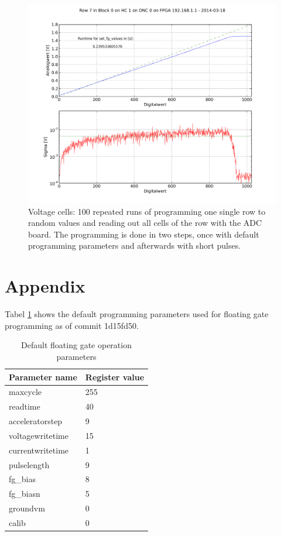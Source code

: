 \documentclass[a4paper,twocolumn,draft=true]{scrartcl}
\begin{document}
\begin{figure}
\includegraphics[scale=.28]{figures/single_row_random_progonerow_afterburn_current.png}
\caption{Voltage cells: 100 repeated runs of programming one single row to random values and reading out all cells of the row with the ADC board. The programming is done in two steps, once with default programming parameters and afterwards with short pulses.}
\label{fig:row_progrow_default_current}
\end{figure}

\section{Appendix}
Tabel \ref{tab:default_fg_values} shows the default programming parameters used for floating gate programming as of commit 1d15fd50.
\begin{table}
\begin{tabular}{l|l}
Parameter name & Register value\\
\hline
maxcycle & 255\\
readtime & 40\\
acceleratorstep & 9\\
voltagewritetime & 15\\
currentwritetime & 1\\
pulselength & 9\\
fg\_bias & 8\\
fg\_biasn & 5\\
groundvm & 0\\
calib & 0\\
\end{tabular}
\caption{Default floating gate operation parameters}
\label{tab:default_fg_values}
\end{table}
\end{document}
